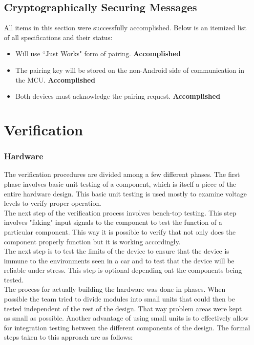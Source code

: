 \documentclass[12pt,letterpaper]{article}
\begin{document}
\subsection{Cryptographically Securing Messages}
All items in this section were successfully accomplished. Below is an itemized list of all specifications and their status:

\begin{itemize}
	\item Will use ``Just Works" form of pairing. \textbf{Accomplished}
	\item The pairing key will be stored on the non-Android side of communication in the MCU. \textbf{Accomplished}
	\item Both devices must acknowledge the pairing request. \textbf{Accomplished}
\end{itemize} 

\newpage

\section{Verification}
\subsubsection{Hardware}
The verification procedures are divided among a few different phases. The first phase involves basic unit testing of a component, which is itself a piece of the entire hardware design. This basic unit testing is used mostly to examine voltage levels to verify proper operation. \\

The next step of the verification process involves bench-top testing. This step involves "faking" input signals to the component to test the function of a particular component. This way it is possible to verify that not only does the component properly function but it is working accordingly. \\

The next step is to test the limits of the device to ensure that the device is immune to the environments seen in a car and to test that the device will be reliable under stress. This step is optional depending ont the components being tested. \\

The process for actually building the hardware was done in phases. When possible the team tried to divide modules into small units that could then be tested independent of the rest of the design. That way problem areas were kept as small as possible. Another advantage of using small units is to effectively allow for integration testing between the different components of the design. The formal steps taken to this approach are as follows:
\end{document}
